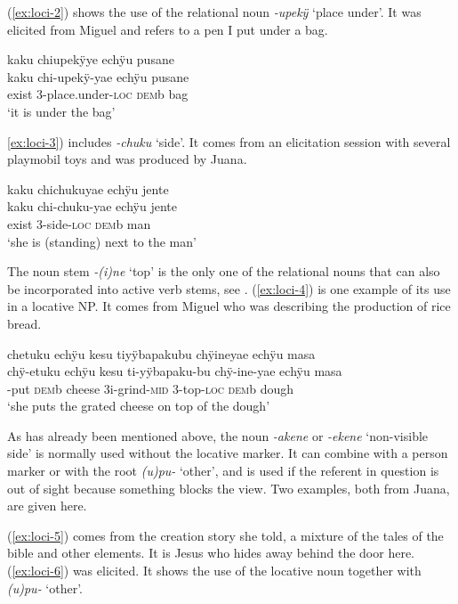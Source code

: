 (\ref{ex:loci-2}) shows the use of the relational noun \textit{-upekÿ} ‘place under’. It was elicited from Miguel and refers to a pen I put under a bag.

\ea\label{ex:loci-2}
\begingl 
\glpreamble kaku chiupekÿye echÿu pusane\\
\gla kaku chi-upekÿ-yae echÿu pusane\\ 
\glb exist 3-place.under-\textsc{loc} \textsc{dem}b bag\\ 
\glft ‘it is under the bag’\\ 
\endgl
\trailingcitation{[mxx-e120505l-1]}
\xe

{\ref{ex:loci-3}) includes \textit{-chuku} ‘side’. It comes from an elicitation session with several playmobil toys and was produced by Juana.

\ea\label{ex:loci-3}
\begingl
\glpreamble kaku chichukuyae echÿu jente\\
\gla kaku chi-chuku-yae echÿu jente\\ 
\glb exist 3-side-\textsc{loc} \textsc{dem}b man\\ 
\glft ‘she is (standing) next to the man’\\ 
\endgl
{}
\xe

The noun stem \textit{-(i)ne} ‘top’ is the only one of the relational nouns that can also be incorporated into active verb stems, see .
(\ref{ex:loci-4}) is one example of its use in a locative NP. It comes from Miguel who was describing the production of rice bread.

\ea\label{ex:loci-4}
\begingl
\glpreamble chetuku echÿu kesu tiyÿbapakubu chÿineyae echÿu masa\\
\gla chÿ-etuku echÿu kesu ti-yÿbapaku-bu chÿ-ine-yae echÿu masa\\
-put \textsc{dem}b cheese 3i-grind-\textsc{mid} 3-top-\textsc{loc} \textsc{dem}b dough\\
\glft ‘she puts the grated cheese on top of the dough’
\endgl
\trailingcitation{[mxx-e120415ls.087]}
\xe

As has already been mentioned above, the noun \textit{-akene} or \textit{-ekene} ‘non-visible side’ is normally used without the locative marker. It can combine with a person marker or with the root \textit{(u)pu-} ‘other’, and is used if the referent in question is out of sight because something blocks the view. Two examples, both from Juana, are given here. 

(\ref{ex:loci-5}) comes from the creation story she told, a mixture of the tales of the bible and other elements. It is Jesus who hides away behind the door here. (\ref{ex:loci-6}) was elicited. It shows the use of the locative noun together with \textit{(u)pu-} ‘other’.

}
